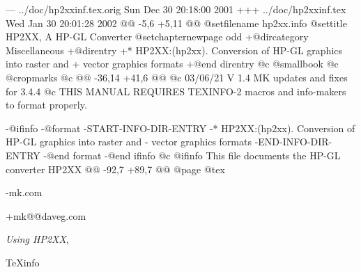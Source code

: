--- ../doc/hp2xxinf.tex.orig	Sun Dec 30 20:18:00 2001
+++ ../doc/hp2xxinf.tex	Wed Jan 30 20:01:28 2002
@@ -5,6 +5,11 @@
 @setfilename hp2xx.info
 @settitle HP2XX, A HP-GL Converter
 @setchapternewpage odd
+@dircategory Miscellaneous
+@direntry
+* HP2XX:(hp2xx).		Conversion of HP-GL graphics into raster and
+				vector graphics formats
+@end direntry
 @c @smallbook
 @c @cropmarks
 @c %
@@ -36,14 +41,6 @@
 @c 03/06/21  V 1.4   MK   updates and fixes for 3.4.4
 @c THIS MANUAL REQUIRES TEXINFO-2 macros and info-makers to format properly.
 
-@ifinfo
-@format
-START-INFO-DIR-ENTRY
-* HP2XX:(hp2xx).  Conversion of HP-GL graphics into raster and
-                  vector graphics formats
-END-INFO-DIR-ENTRY
-@end format
-@end ifinfo
 @c
 @ifinfo
 This file documents the HP-GL converter HP2XX
@@ -92,7 +89,7 @@
 @page
 @tex
 {\parskip=0pt
-\hfill mk\@daveg.com\par
+\hfill mk@@daveg.com\par
 \hfill {\it Using HP2XX}, \manvers\par
 \hfill \TeX{}info \texinfoversion\par
 }
